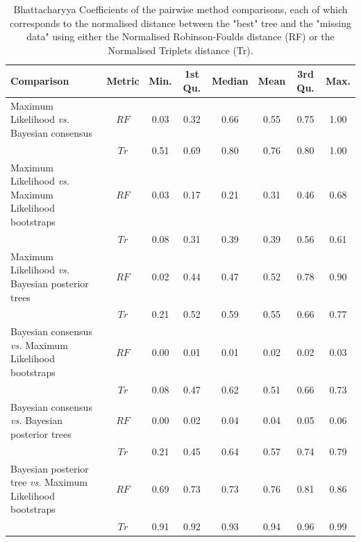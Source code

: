 \begin{landscape}
\begin{table}[ht]
\caption{Bhattacharyya Coefficients of the pairwise method comparisons, each of which corresponds to the normalised distance between the "best" tree and the "missing data" using either the Normalised Robinson-Foulds distance (RF) or the Normalised Triplets distance (Tr).}
\label{Tab_Supp_summary_BC_MC}
\centering
\begin{tabular}{lccccccc}
  \hline
 Comparison &  Metric & Min. & 1st Qu. & Median & Mean & 3rd Qu. & Max. \\  
  \hline
    Maximum Likelihood \textit{vs.} Bayesian consensus                 & $RF$ & 0.03 & 0.32 & 0.66 & 0.55 & 0.75 & 1.00 \\ 
                                                                       & $Tr$ & 0.51 & 0.69 & 0.80 & 0.76 & 0.80 & 1.00 \\ 
    Maximum Likelihood \textit{vs.} Maximum Likelihood bootstraps      & $RF$ & 0.03 & 0.17 & 0.21 & 0.31 & 0.46 & 0.68 \\ 
                                                                       & $Tr$ & 0.08 & 0.31 & 0.39 & 0.39 & 0.56 & 0.61 \\ 
    Maximum Likelihood \textit{vs.} Bayesian posterior trees           & $RF$ & 0.02 & 0.44 & 0.47 & 0.52 & 0.78 & 0.90 \\ 
                                                                       & $Tr$ & 0.21 & 0.52 & 0.59 & 0.55 & 0.66 & 0.77 \\ 
    Bayesian consensus \textit{vs.} Maximum Likelihood bootstraps      & $RF$ & 0.00 & 0.01 & 0.01 & 0.02 & 0.02 & 0.03 \\ 
                                                                       & $Tr$ & 0.08 & 0.47 & 0.62 & 0.51 & 0.66 & 0.73 \\ 
    Bayesian consensus \textit{vs.} Bayesian posterior trees           & $RF$ & 0.00 & 0.02 & 0.04 & 0.04 & 0.05 & 0.06 \\ 
                                                                       & $Tr$ & 0.21 & 0.45 & 0.64 & 0.57 & 0.74 & 0.79 \\ 
    Bayesian posterior tree \textit{vs.} Maximum Likelihood bootstraps & $RF$ & 0.69 & 0.73 & 0.73 & 0.76 & 0.81 & 0.86 \\ 
                                                                       & $Tr$ & 0.91 & 0.92 & 0.93 & 0.94 & 0.96 & 0.99 \\ 
   \hline
\end{tabular}
\end{table}
\end{landscape}